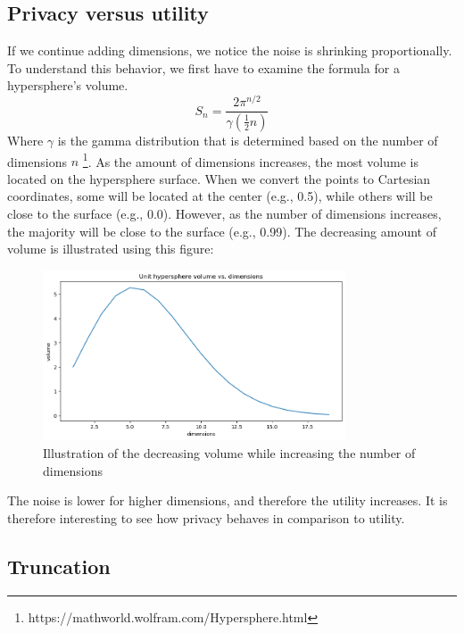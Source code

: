 \subsection{Privacy versus utility} \label{theory:privacy-utility-nd}
If we continue adding dimensions, we notice the noise is shrinking proportionally.
To understand this behavior, we first have to examine the formula for a hypersphere’s volume.
\begin{equation}
  S_n = \frac{2 \pi^{n/2}}{\gamma(\frac{1}{2}n)}
\end{equation}
Where $\gamma$ is the gamma distribution that is determined based on the number of dimensions $n$ \footnote{https://mathworld.wolfram.com/Hypersphere.html}.
As the amount of dimensions increases, the most volume is located on the hypersphere surface.
When we convert the points to Cartesian coordinates, some will be located at the center (e.g., 0.5), while others will be close to the surface (e.g., 0.0).
However, as the number of dimensions increases, the majority will be close to the surface (e.g., 0.99).
The decreasing amount of volume is illustrated using this figure:
\begin{figure}[ht]
  \includegraphics[width=0.8\textwidth]{TheorethicalFramework/ND-Laplace/Images/volume.png}
  \caption{Illustration of the decreasing volume while increasing the number of dimensions}
  \label{fig:curse-of-dimensionality}
\end{figure}

The noise is lower for higher dimensions, and therefore the utility increases.
It is therefore interesting to see how privacy behaves in comparison to utility.

\subsection{Truncation}
